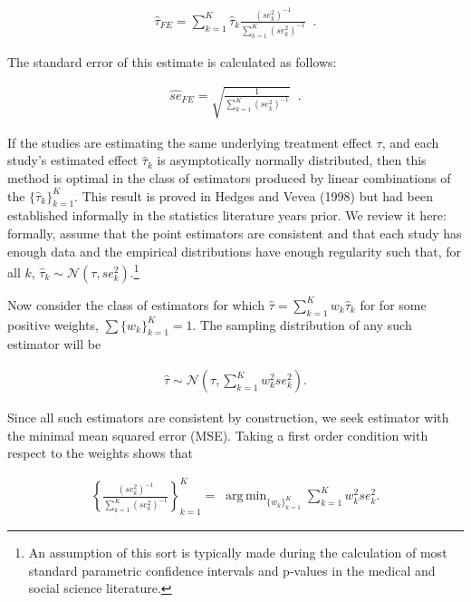 \documentclass[12pt]{article}
\DeclareMathOperator*{\argmin}{arg\,min}
\begin{document}
\begin{equation}
\label{fe_tau}
\begin{aligned}
\hat{\tau}_{FE} = \sum_{k=1}^K \hat{\tau}_k \frac{  (se^2_k)^{-1}   }{  \sum_{k=1}^K  (se^2_k)^{-1}  } \; \; .
\end{aligned}
\end{equation}

The standard error of this estimate is calculated as follows:

\begin{equation}
\label{fe_se}
\begin{aligned}
\hat{se}_{FE} = \sqrt{ \frac{ 1  }{  \sum_{k=1}^K  (se^2_k)^{-1}  }} \; \; .
\end{aligned}
\end{equation}

If the studies are estimating the same underlying treatment effect $\tau$, and each study's estimated effect $\hat{\tau}_k$ is asymptotically  normally distributed, then this method is optimal in the class of estimators produced by linear combinations of the $\{\hat{\tau}_k\}_{k=1}^K$. This result is proved in Hedges and Vevea (1998) but had been established informally in the statistics literature years prior. We review it here: formally, assume that the point estimators are consistent and that each study has enough data and the empirical distributions have enough regularity such that, for all $k$, $\hat{\tau}_k \sim \mathcal{N}(\tau, se^2_{k})$.\footnote{An assumption of this sort is typically made during the calculation of most standard parametric confidence intervals and p-values in the medical and social science literature.}

Now consider the class of estimators for which $\hat{\tau} = \sum_{k=1}^{K} w_k \hat{\tau}_k$ for 
for some positive weights, $\sum \{w_k\}_{k=1}^K =1$.
The sampling distribution of any such estimator will be

\begin{equation}
\begin{aligned}
\hat{\tau} \sim \mathcal{N}(\tau, \sum_{k=1}^{K} w_k^2 se^2_{k}) .
\end{aligned}
\end{equation}

Since all such estimators are consistent by construction, we seek estimator with the minimal mean squared error (MSE). Taking a first order condition with respect to the weights shows that

\begin{equation}\label{fe}
\begin{aligned}
\left\{ \frac{(se^2_k)^{-1}}{\sum_{k=1}^K(se^2_k)^{-1}} \right\}_{k=1}^K = \; \argmin_{ \{w_k\}_{k=1}^K  } \sum_{k=1}^{K} w_k^2 se^2_{k}.
\end{aligned}
\end{equation}
\end{document}
